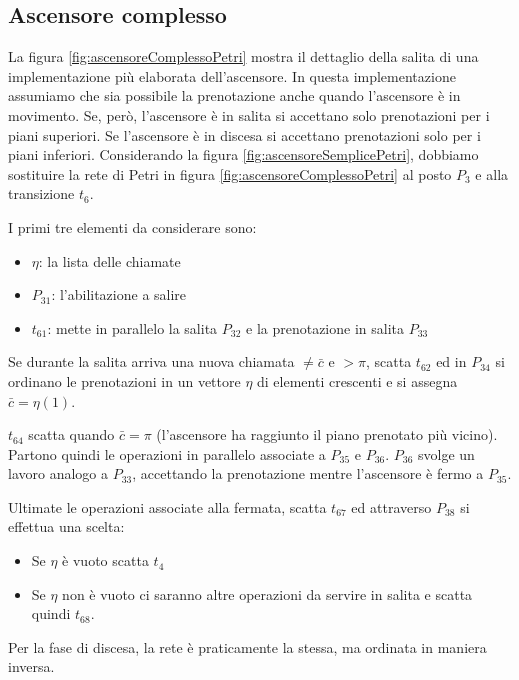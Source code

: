 \documentclass[a4paper]{report}
\begin{document}
\subsection{Ascensore complesso}

La figura \ref{fig:ascensoreComplessoPetri} mostra il dettaglio della
salita di una implementazione pi\`u elaborata dell'ascensore. In
questa implementazione assumiamo che sia possibile la prenotazione
anche quando l'ascensore \`e in movimento. Se, per\`o, l'ascensore \`e
in salita si accettano solo prenotazioni per i piani superiori. Se
l'ascensore \`e in discesa si accettano prenotazioni solo per i piani
inferiori. Considerando la figura \ref{fig:ascensoreSemplicePetri}, dobbiamo
sostituire la rete di Petri in figura
\ref{fig:ascensoreComplessoPetri} al posto $P_3$ e alla transizione
$t_6$.

I primi tre elementi da considerare sono:
\begin{itemize}
\item $\eta$: la lista delle chiamate
\item $P_{31}$: l'abilitazione a salire
\item $t_{61}$: mette in parallelo la salita $P_{32}$ e la
  prenotazione in salita $P_{33}$
\end{itemize}

Se durante la salita arriva una nuova chiamata $\neq \bar{c}$ e $>
\pi$, scatta $t_{62}$ ed in $P_{34}$ si ordinano le prenotazioni in un
vettore $\eta$ di elementi crescenti e si assegna $\bar{c} = \eta(1)$.

$t_{64}$ scatta quando $\bar{c} = \pi$ (l'ascensore ha raggiunto il
piano prenotato pi\`u vicino). Partono quindi le operazioni in
parallelo associate a $P_{35}$ e $P_{36}$. $P_{36}$ svolge un lavoro
analogo a $P_{33}$, accettando la prenotazione mentre l'ascensore \`e
fermo a $P_{35}$.

Ultimate le operazioni associate alla fermata, scatta $t_{67}$ ed
attraverso $P_{38}$ si effettua una scelta:
\begin{itemize}
\item Se $\eta$ \`e vuoto scatta $t_4$
\item Se $\eta$ non \`e vuoto ci saranno altre operazioni da servire
  in salita e scatta quindi $t_{68}$.
\end{itemize}

Per la fase di discesa, la rete \`e praticamente la stessa, ma ordinata
in maniera inversa.
\end{document}
